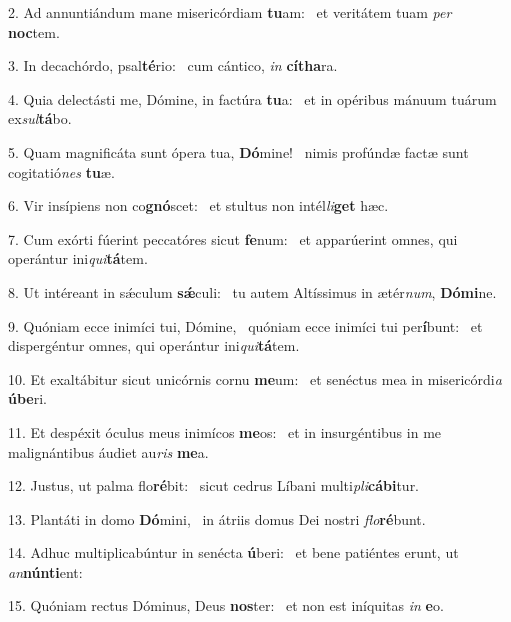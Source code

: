 2. Ad annuntiándum mane misericórdiam \textbf{tu}am: \ast\  et veritátem tuam \textit{per} \textbf{noc}tem.\

3. In decachórdo, psal\textbf{té}rio: \ast\  cum cántico, \textit{in} \textbf{cí}\textbf{tha}ra.\

4. Quia delectásti me, Dómine, in factúra \textbf{tu}a: \ast\  et in opéribus mánuum tuárum ex\textit{sul}\textbf{tá}bo.\

5. Quam magnificáta sunt ópera tua, \textbf{Dó}mine! \ast\  nimis profúndæ factæ sunt cogitatió\textit{nes} \textbf{tu}æ.\

6. Vir insípiens non co\textbf{gnó}scet: \ast\  et stultus non intél\textit{li}\textbf{get} hæc.\

7. Cum exórti fúerint peccatóres sicut \textbf{fe}num: \ast\  et apparúerint omnes, qui operántur ini\textit{qui}\textbf{tá}tem.\

8. Ut intéreant in sǽculum \textbf{sǽ}culi: \ast\  tu autem Altíssimus in ætér\textit{num}, \textbf{Dó}\textbf{mi}ne.\

9. Quóniam ecce inimíci tui, Dómine, \dag\  quóniam ecce inimíci tui per\textbf{í}bunt: \ast\  et dispergéntur omnes, qui operántur ini\textit{qui}\textbf{tá}tem.\

10. Et exaltábitur sicut unicórnis cornu \textbf{me}um: \ast\  et senéctus mea in misericórdi\textit{a} \textbf{ú}\textbf{be}ri.\

11. Et despéxit óculus meus inimícos \textbf{me}os: \ast\  et in insurgéntibus in me malignántibus áudiet au\textit{ris} \textbf{me}a.\

12. Justus, ut palma flo\textbf{ré}bit: \ast\  sicut cedrus Líbani multi\textit{pli}\textbf{cá}\textbf{bi}tur.\

13. Plantáti in domo \textbf{Dó}mini, \ast\  in átriis domus Dei nostri \textit{flo}\textbf{ré}bunt.\

14. Adhuc multiplicabúntur in senécta \textbf{ú}beri: \ast\  et bene patiéntes erunt, ut \textit{an}\textbf{nún}\textbf{ti}ent:\

15. Quóniam rectus Dóminus, Deus \textbf{nos}ter: \ast\  et non est iníquitas \textit{in} \textbf{e}o.\


